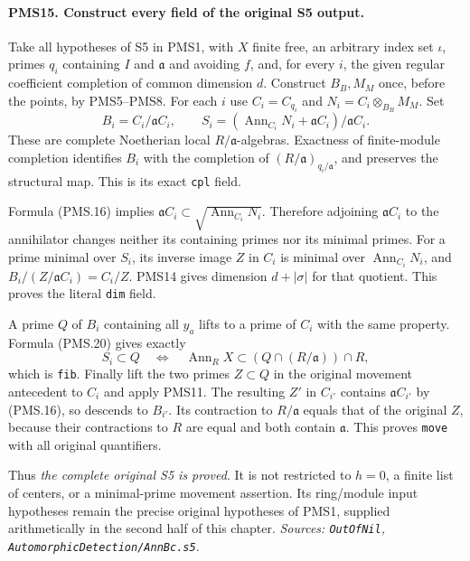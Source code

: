 \paragraph{PMS15. Construct every field of the original S5 output.}
\label{claim:PMS15}
Take all hypotheses of S5 in PMS1, with $X$ finite free, an
arbitrary index set $\iota$, primes $q_i$ containing $I$ and
$\mathfrak a$ and avoiding $f$, and, for every $i$, the given
regular coefficient completion of common dimension $d$.
Construct $B_B,M_M$ once, before the points, by PMS5--PMS8.
For each $i$ use $C_i=C_{q_i}$ and $N_i=C_i\otimes_{B_B}M_M$.
Set
\[
 B_i=C_i/\mathfrak aC_i,\qquad
 S_i=(\operatorname{Ann}_{C_i}N_i+\mathfrak aC_i)/\mathfrak aC_i.
                                                        \tag{PMS.26}
\]
These are complete Noetherian local $R/\mathfrak a$-algebras.
Exactness of finite-module completion identifies $B_i$ with the
completion of $(R/\mathfrak a)_{q_i/\mathfrak a}$, and preserves
the structural map.  This is its exact \texttt{cpl} field.

Formula (PMS.16) implies
$\mathfrak aC_i\subset\sqrt{\operatorname{Ann}_{C_i}N_i}$.
Therefore adjoining $\mathfrak aC_i$ to the annihilator changes
neither its containing primes nor its minimal primes.  For a
prime minimal over $S_i$, its inverse image $Z$ in $C_i$ is
minimal over $\operatorname{Ann}_{C_i}N_i$, and
$B_i/(Z/\mathfrak aC_i)=C_i/Z$.
PMS14 gives dimension $d+|\sigma|$ for that quotient.  This
proves the literal \texttt{dim} field.

A prime $Q$ of $B_i$ containing all $y_a$ lifts to a prime of
$C_i$ with the same property.  Formula (PMS.20) gives exactly
\[
 S_i\subset Q
 \quad\Longleftrightarrow\quad
 \operatorname{Ann}_R X
   \subset (Q\cap(R/\mathfrak a))\cap R,          \tag{PMS.27}
\]
which is \texttt{fib}.  Finally lift the two primes $Z\subset Q$
in the original movement antecedent to $C_i$ and apply PMS11.
The resulting $Z'$ in $C_{i'}$ contains $\mathfrak aC_{i'}$ by
(PMS.16), so descends to $B_{i'}$.  Its contraction to
$R/\mathfrak a$ equals that of the original $Z$, because their
contractions to $R$ are equal and both contain $\mathfrak a$.
This proves \texttt{move} with all original quantifiers.

Thus \emph{the complete original S5 is proved}.  It is not
restricted to $h=0$, a finite list of centers, or a minimal-prime
movement assertion.  Its ring/module input hypotheses remain
the precise original hypotheses of PMS1, supplied arithmetically
in the second half of this chapter.
\hfill\textit{Sources: \texttt{OutOfNil},
\texttt{AutomorphicDetection/AnnBc.s5}.}

